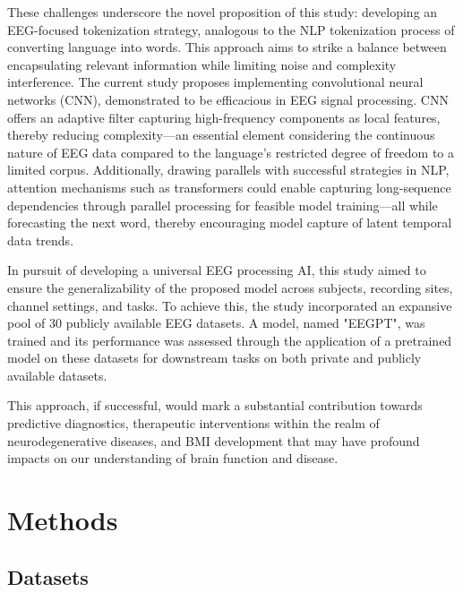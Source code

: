 \documentclass[final,3p,times,twocolumn]{elsarticle}
\begin{document}
These challenges underscore the novel proposition of this study: developing an EEG-focused tokenization strategy, analogous to the NLP tokenization process of converting language into words. This approach aims to strike a balance between encapsulating relevant information while limiting noise and complexity interference.
The current study proposes implementing convolutional neural networks (CNN), demonstrated to be efficacious in EEG signal processing. CNN offers an adaptive filter capturing high-frequency components as local features, thereby reducing complexity—an essential element considering the continuous nature of EEG data compared to the language’s restricted degree of freedom to a limited corpus. Additionally, drawing parallels with successful strategies in NLP, attention mechanisms such as transformers could enable capturing long-sequence dependencies through parallel processing for feasible model training—all while forecasting the next word, thereby encouraging model capture of latent temporal data trends.

In pursuit of developing a universal EEG processing AI, this study aimed to ensure the generalizability of the proposed model across subjects, recording sites, channel settings, and tasks. To achieve this, the study incorporated an expansive pool of 30 publicly available EEG datasets. A model, named "EEGPT", was trained and its performance was assessed through the application of a pretrained model on these datasets for downstream tasks on both private and publicly available datasets.

This approach, if successful, would mark a substantial contribution towards predictive diagnostics, therapeutic interventions within the realm of neurodegenerative diseases, and BMI development that may have profound impacts on our understanding of brain function and disease.

\label{sec:introduction}
\section{Methods}
\subsection{Datasets}
\end{document}
